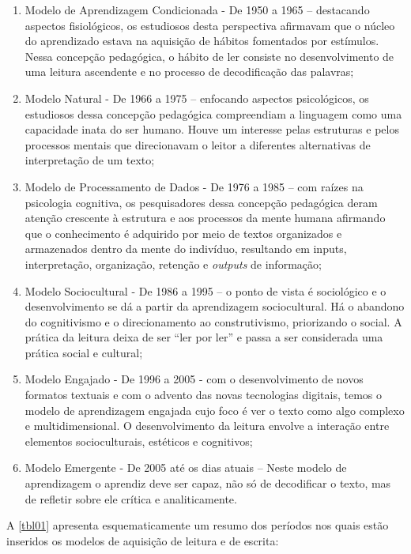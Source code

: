 \documentclass{textolivre}
\begin{document}
\begin{enumerate}[label={\alph*}]
    \item Modelo de Aprendizagem Condicionada - De 1950 a 1965 – destacando aspectos fisiológicos, os estudiosos desta perspectiva afirmavam que o núcleo do aprendizado estava na aquisição de hábitos fomentados por estímulos. Nessa concepção pedagógica, o hábito de ler consiste no desenvolvimento de uma leitura ascendente e no processo de decodificação das palavras;
    \item Modelo Natural - De 1966 a 1975 – enfocando aspectos psicológicos, os estudiosos dessa concepção pedagógica compreendiam a linguagem como uma capacidade inata do ser humano. Houve um interesse pelas estruturas e pelos processos mentais que direcionavam o leitor a diferentes alternativas de interpretação de um texto;
    \item Modelo de Processamento de Dados - De 1976 a 1985 – com raízes na psicologia cognitiva, os pesquisadores dessa concepção pedagógica deram atenção crescente à estrutura e aos processos da mente humana afirmando que o conhecimento é adquirido por meio de textos organizados e armazenados dentro da mente do indivíduo, resultando em inputs, interpretação, organização, retenção e \textit{outputs} de informação;
    \item Modelo Sociocultural - De 1986 a 1995 – o ponto de vista é sociológico e o desenvolvimento se dá a partir da aprendizagem sociocultural. Há o abandono do cognitivismo e o direcionamento ao construtivismo, priorizando o social. A prática da leitura deixa de ser “ler por ler” e passa a ser considerada uma prática social e cultural;
    \item Modelo Engajado - De 1996 a 2005 - com o desenvolvimento de novos formatos textuais e com o advento das novas tecnologias digitais, temos o modelo de aprendizagem engajada cujo foco é ver o texto como algo complexo e multidimensional. O desenvolvimento da leitura envolve a interação entre elementos socioculturais, estéticos e cognitivos;
    \item Modelo Emergente - De 2005 até os dias atuais – Neste modelo de aprendizagem o aprendiz deve ser capaz, não só de decodificar o texto, mas de refletir sobre ele crítica e analiticamente. 
\end{enumerate}

A \cref{tbl01} apresenta esquematicamente um resumo dos períodos nos quais estão inseridos os modelos de aquisição de leitura e de escrita:
\end{document}
